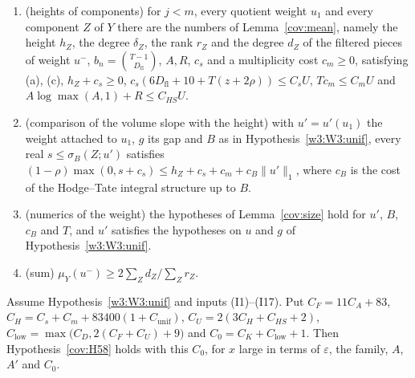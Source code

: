 \begin{enumerate}
\item[(I14)] (heights of components) for $j<m$, every quotient weight $u_1$ and every component $Z$ of $Y$ there are the numbers of Lemma~\ref{cov:mean}, namely the height $h_Z$, the degree $\delta_Z$, the rank $r_Z$ and the degree $d_Z$ of the filtered pieces of weight $u^-$, $b_n=\binom{T-1}{D_{\mathrm{fl}}}$, $A,R$, $c_s$ and a multiplicity cost $c_m\ge0$, satisfying (a), (c), $h_Z+c_s\ge0$, $c_s(6D_{\mathrm{fl}}+10+T(z+2\rho))\le C_sU$, $Tc_m\le C_mU$ and $A\log\max(A,1)+R\le C_{HS}U$.
\item[(I15)] (comparison of the volume slope with the height) with $u'=u'(u_1)$ the weight attached to $u_1$, $g$ its gap and $B$ as in Hypothesis~\ref{w3:W3:unif}, every real $s\le\sigma_B(Z;u')$ satisfies $(1-\rho)\max(0,s+c_s)\le h_Z+c_s+c_m+c_B\lVert u'\rVert_1$, where $c_B$ is the cost of the Hodge--Tate integral structure up to $B$.
\item[(I16)] (numerics of the weight) the hypotheses of Lemma~\ref{cov:size} hold for $u'$, $B$, $c_B$ and $T$, and $u'$ satisfies the hypotheses on $u$ and $g$ of Hypothesis~\ref{w3:W3:unif}.
\item[(I17)] (sum) $\mu_Y(u^-)\ge2\sum_Zd_Z/\sum_Zr_Z$.
\end{enumerate}

\begin{theorem}\label{cov:main}
Assume Hypothesis~\ref{w3:W3:unif} and inputs (I1)--(I17). Put $C_F=11C_A+83$, $C_H=C_s+C_m+83400(1+C_{\mathrm{unif}})$, $C_U=2(3C_H+C_{HS}+2)$, $C_{\mathrm{low}}=\max\big(C_D,2(C_F+C_U)+9\big)$ and $C_0=C_K+C_{\mathrm{low}}+1$. Then Hypothesis~\ref{cov:H58} holds with this $C_0$, for $x$ large in terms of $\varepsilon$, the family, $A$, $A'$ and $C_0$.
\end{theorem}

